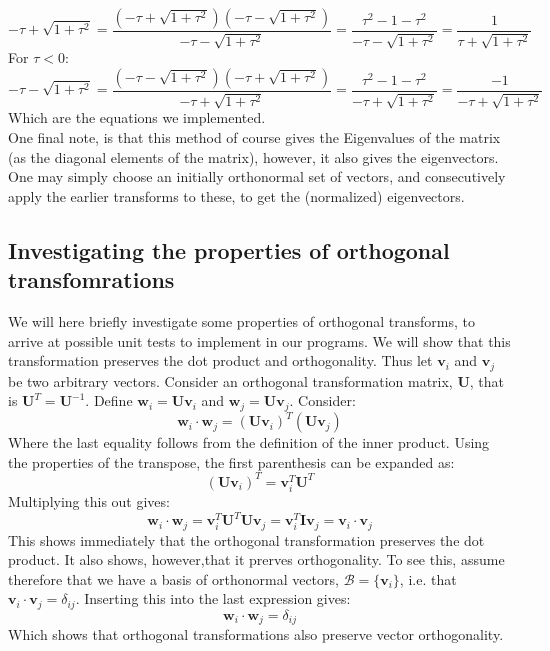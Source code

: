 \documentclass[a4paper, 10pt]{article}
\begin{document}
\begin{equation}
-\tau + \sqrt{1+\tau^2}=\frac{(-\tau + \sqrt{1+\tau^2})(-\tau-\sqrt{1+\tau^2})}{-\tau-\sqrt{1+\tau^2}}=\frac{\tau^2-1-\tau^2}{-\tau-\sqrt{1+\tau^2}}=\frac{1}{\tau+\sqrt{1+\tau^2}}
\end{equation}
For $\tau < 0$:
\begin{equation}
-\tau - \sqrt{1+\tau^2}=\frac{(-\tau - \sqrt{1+\tau^2})(-\tau+\sqrt{1+\tau^2})}{-\tau+\sqrt{1+\tau^2}}=\frac{\tau^2-1-\tau^2}{-\tau+\sqrt{1+\tau^2}}=\frac{-1}{-\tau+\sqrt{1+\tau^2}}
\end{equation}
Which are the equations we implemented.\\
\linebreak
One final note, is that this method of course gives the Eigenvalues of the matrix (as the diagonal elements of the matrix), however, it also gives the eigenvectors. One may simply choose an initially orthonormal set of vectors, and consecutively apply the earlier transforms to these, to get the (normalized) eigenvectors.

\subsection{Investigating the properties of orthogonal transfomrations}\label{orthogonal_trans}
We will here briefly investigate some properties of orthogonal transforms, to arrive at possible unit tests to implement in our programs. 
We will show that this transformation preserves the dot product and orthogonality. Thus let $\mathbf{v}_i$ and $\mathbf{v}_j$ be two arbitrary vectors. Consider an orthogonal transformation matrix, $\mathbf{U}$, that is $\mathbf{U}^T=\mathbf{U}^{-1}$. Define $\mathbf{w}_i=\mathbf{U}\mathbf{v}_i$ and $\mathbf{w}_j=\mathbf{U}\mathbf{v}_j$. Consider:
$$\mathbf{w}_i \cdot \mathbf{w}_j=\left(\mathbf{U}\mathbf{v}_i\right)^T\left(\mathbf{U}\mathbf{v}_j\right)$$
Where the last equality follows from the definition of the inner product. Using the properties of the transpose, the first parenthesis can be expanded as:
$$\left(\mathbf{U}\mathbf{v}_i\right)^T = \mathbf{v}_i^T\mathbf{U}^T$$
Multiplying this out gives:
$$\mathbf{w}_i\cdot \mathbf{w}_j=\mathbf{v}_i^T\mathbf{U}^T\mathbf{U}\mathbf{v}_j=
\mathbf{v}_i^T\mathbf{I}\mathbf{v}_j=\mathbf{v}_i\cdot \mathbf{v}_j$$
This shows immediately that the orthogonal transformation preserves the dot product. It also shows, however,that it prerves orthogonality. To see this, assume therefore that we have a basis of orthonormal vectors, $\mathcal{B}=\{\mathbf{v}_i\}$, i.e. that $\mathbf{v}_i\cdot \mathbf{v}_j=\delta_{ij}$. Inserting this into the last expression gives:
$$\mathbf{w}_i\cdot \mathbf{w}_j=\delta_{ij}$$
Which shows that orthogonal transformations also preserve vector orthogonality.
\end{document}
